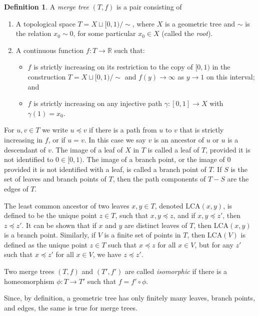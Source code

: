 \documentclass{article}
\theoremstyle{definition}
\newtheorem{definition}[theorem]{Definition}
\newcommand{\LCA}{\mathrm{LCA}}
\begin{document}
\begin{definition}
\label{def:mt}
    A \emph{merge tree} $(T,f)$ is a pair consisting of
    \begin{enumerate}
        \item A topological space $T = X\sqcup[0,1)/\sim$, where $X$ is a geometric tree and $\sim$ is the relation $x_0\sim 0$, for some particular $x_0\in X$ (called the \emph{root}).
        \item A continuous function $f: T \to \mathbb{R}$ such that:
            \begin{itemize}
                \item $f$ is strictly increasing on its restriction to the copy of $[0,1)$ in the construction $T = X \sqcup[0,1)/\sim$ and $f(y) \to \infty$ as $y \to 1$ on this interval; and
                \item $f$ is strictly increasing on any injective path $\gamma: [0,1] \to X$ with $\gamma(1) = x_0$.
            \end{itemize}
    \end{enumerate}
    For $u,v \in T$ we write $u \preceq v$ if there is a path from $u$ to $v$ that is strictly increasing in $f$, or if $u=v$. In this case we say $v$ is an ancestor of $u$ or $u$ is a descendant of $v$. The image of a leaf of $X$ in $T$ is called a leaf of $T$, provided it is not identified to $0\in[0,1)$. The image of a branch point, or the image of $0$ provided it is not identified with a leaf, is called a branch point of $T$. If $S$ is the set of leaves and branch points of $T$, then the path components of $T-S$ are the edges of $T$.

    The least common ancestor of two leaves $x,y\in T$, denoted $\LCA(x,y)$, is defined to be the unique point $z\in T$, such that $x,y\preceq z$, and if $x,y \preceq z'$, then $z \preceq z'$. It can be shown that if $x$ and $y$ are distinct leaves of $T$, then $\LCA(x,y)$ is a branch point. Similarly, if $V$ is a finite set of points in $T$, then $\LCA(V)$ is defined as the unique point $z \in T$ such that $x \preceq z$ for all $x \in V$, but for any $z'$ such that $x \preceq z'$ for all $x \in V$, we have $z \preceq z'$.

    Two merge trees $(T,f)$ and $(T',f')$ are called \emph{isomorphic} if there is a homeomorphism $\phi: T \to T'$ such that $f = f'\circ \phi$.
\end{definition}

Since, by definition, a geometric tree has only finitely many leaves, branch points, and edges, the same is true for merge trees.
\end{document}
